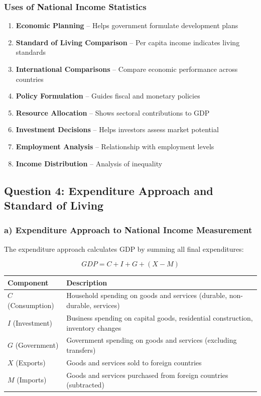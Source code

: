 \documentclass[12pt,a4paper]{article}
\begin{document}
\subsubsection*{Uses of National Income Statistics}
\begin{enumerate}
    \item \textbf{Economic Planning} -- Helps government formulate development plans
    \item \textbf{Standard of Living Comparison} -- Per capita income indicates living standards
    \item \textbf{International Comparisons} -- Compare economic performance across countries
    \item \textbf{Policy Formulation} -- Guides fiscal and monetary policies
    \item \textbf{Resource Allocation} -- Shows sectoral contributions to GDP
    \item \textbf{Investment Decisions} -- Helps investors assess market potential
    \item \textbf{Employment Analysis} -- Relationship with employment levels
    \item \textbf{Income Distribution} -- Analysis of inequality
\end{enumerate}


\subsection{Question 4: Expenditure Approach and Standard of Living}

\subsubsection*{a) Expenditure Approach to National Income Measurement}
The expenditure approach calculates GDP by summing all final expenditures:

\begin{equation}
GDP = C + I + G + (X - M)
\end{equation}

\begin{center}
\begin{tabular}{@{}p{2cm}p{11cm}@{}}
\toprule
\textbf{Component} & \textbf{Description} \\
\midrule
$C$ (Consumption) & Household spending on goods and services (durable, non-durable, services) \\
\addlinespace
$I$ (Investment) & Business spending on capital goods, residential construction, inventory changes \\
\addlinespace
$G$ (Government) & Government spending on goods and services (excluding transfers) \\
\addlinespace
$X$ (Exports) & Goods and services sold to foreign countries \\
\addlinespace
$M$ (Imports) & Goods and services purchased from foreign countries (subtracted) \\
\bottomrule
\end{tabular}
\end{center}
\end{document}
